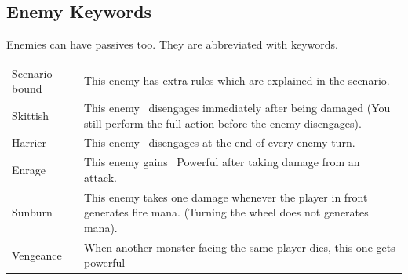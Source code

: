 
\subsection*{Enemy Keywords}
Enemies can have passives too. They are abbreviated with keywords.

\begin{longtable}{|p{2.5cm}|p{13.7cm}|}
	\hline
	Scenario bound & This enemy has extra rules which are explained in the scenario.\\
	Skittish & This enemy \symDisengage~disengages immediately after being damaged (You still perform the full action before the enemy disengages).\\
	Harrier & This enemy \symDisengage~disengages at the end of every enemy turn.\\
	Enrage & This enemy gains \symPowerful~Powerful after taking damage from an attack.\\
	Sunburn & This enemy takes one damage whenever the player in front generates fire mana. (Turning the wheel does not generates mana).\\
	Vengeance & When another monster facing the same player dies, this one gets powerful\\
	\hline 
\end{longtable}